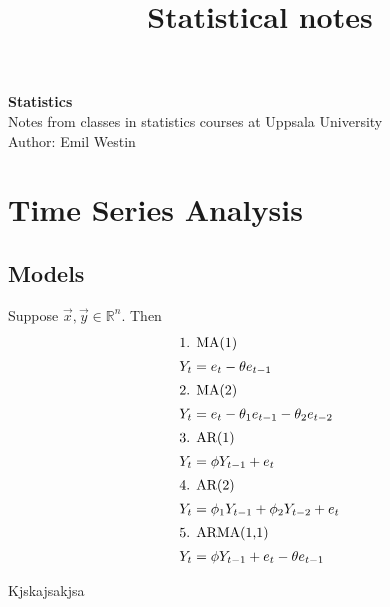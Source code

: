 \documentclass[11pt]{article}
\begin{document}
\title{Statistical notes}

\thispagestyle{empty}

\begin{center}
{\LARGE \bf Statistics}\\
Notes from classes in statistics courses at Uppsala University \\
Author: Emil Westin
\end{center}

\section{Time Series Analysis}
\subsection{Models}

Suppose $\vec{x},\vec{y} \in \mathbb{R}^n$. Then 
\begin{align}
\intertext{1. MA(1) }
Y_t & = e_t - \theta e_{t-1} \label{MA1} \\
\intertext{2. MA(2)}
Y_t & = e_t - \theta_1 e_{t-1} -  \theta_2 e_{t-2} \label{MA2} \\
\intertext{3. AR(1)}
Y_t & = \phi Y_{t-1} + e_t \label{AR1} \\
\intertext{4. AR(2)}
Y_t & = \phi_1 Y_{t-1} + \phi_2 Y_{t-2} + e_t \label{AR2} \\
\intertext{5. ARMA(1,1)}
Y_t & = \phi Y_{t-1} + e_t - \theta e_{t-1} \label{ARMA} 
\end{align}

Kjskajsakjsa
\end{document}
